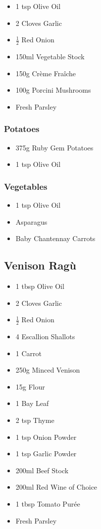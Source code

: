 \documentclass[11pt, english]{article}
\begin{document}
	\begin{itemize}
        \setlength\itemsep{0cm}
                \item 1 tsp Olive Oil
		\item 2 Cloves Garlic
		\item $\frac{1}{2}$ Red Onion
		\item 150ml Vegetable Stock 
		\item 150g Cr\`{e}me Fra\^{i}che
		\item 100g Porcini Mushrooms
		\item Fresh Parsley
        \end{itemize}

		\subsubsection*{Potatoes}

        \begin{itemize}
        \setlength\itemsep{0cm}
                \item 375g Ruby Gem Potatoes
		\item 1 tsp Olive Oil
        \end{itemize}

		\subsubsection*{Vegetables}

	\begin{itemize}
        \setlength\itemsep{0cm}
		\item 1 tsp Olive Oil
                \item Asparagus
		\item Baby Chantennay Carrots
        \end{itemize}

\newpage

	\subsection{Venison Rag\`{u}}

	\begin{itemize}
	\setlength\itemsep{0cm}
		\item 1 tbsp Olive Oil
		\item 2 Cloves Garlic
		\item $\frac{1}{2}$ Red Onion
		\item 4 Escallion Shallots
		\item 1 Carrot
		\item 250g Minced Venison 
		\item 15g Flour
		\item 1 Bay Leaf
		\item 2 tsp Thyme
		\item 1 tsp Onion Powder
		\item 1 tsp Garlic Powder
		\item 200ml Beef Stock
		\item 200ml Red Wine of Choice
		\item 1 tbsp Tomato Pur\'{e}e 
		\item Fresh Parsley
	\end{itemize}
\end{document}
